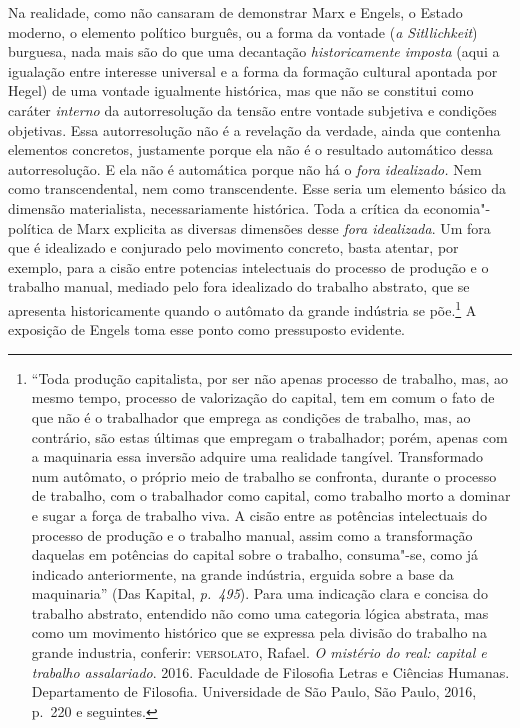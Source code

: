 Na realidade, como não cansaram de demonstrar Marx e Engels, o Estado
moderno, o elemento político burguês, ou a forma da vontade (\emph{a
Sitllichkeit}) burguesa, nada mais são do que uma decantação
\emph{historicamente imposta} (aqui a igualação entre interesse
universal e a forma da formação cultural apontada por Hegel) de uma
vontade igualmente histórica, mas que não se constitui como caráter
\emph{interno} da autorresolução da tensão entre vontade subjetiva e
condições objetivas. Essa autorresolução não é a revelação da verdade,
ainda que contenha elementos concretos, justamente porque ela não é o
resultado automático dessa autorresolução. E ela não é automática
porque não há o \emph{fora idealizado.} Nem como transcendental, nem
como transcendente. Esse seria um elemento básico da dimensão
materialista, necessariamente histórica. Toda a crítica da
economia"-política de Marx explicita as diversas dimensões desse
\emph{fora idealizada}. Um fora que é idealizado e conjurado pelo
movimento concreto, basta atentar, por exemplo, para a cisão entre %
potencias intelectuais do processo de produção e o trabalho manual,
mediado pelo fora idealizado do trabalho abstrato, que se apresenta
historicamente quando o autômato da grande indústria se põe.\footnote{``Toda
  produção capitalista, por ser não apenas processo de trabalho, mas, ao
  mesmo tempo, processo de valorização do capital, tem em comum o fato
  de que não é o trabalhador que emprega as condições de trabalho, mas,
  ao contrário, são estas últimas que empregam o trabalhador; porém,
  apenas com a maquinaria essa inversão adquire uma realidade tangível.
  Transformado num autômato, o próprio meio de trabalho se confronta,
  durante o processo de trabalho, com o trabalhador como capital, como
  trabalho morto a dominar e sugar a força de trabalho viva. A cisão
  entre as potências intelectuais do processo de produção e o trabalho
  manual, assim como a transformação daquelas em potências do capital
  sobre o trabalho, consuma"-se, como já indicado anteriormente, na
  grande indústria, erguida sobre a base da maquinaria'' (Das Kapital,
  \emph{p.~495}). Para uma indicação clara e concisa do trabalho
  abstrato, entendido não como uma categoria lógica abstrata, mas como
  um movimento histórico que se expressa pela divisão do trabalho na
  grande industria, conferir: \textsc{versolato}, Rafael. \emph{O
  mistério do real: capital e trabalho assalariado}. 2016. Faculdade de
  Filosofia Letras e Ciências Humanas. Departamento de Filosofia.
  Universidade de São Paulo, São Paulo, 2016, p.~220 e seguintes.} A
exposição de Engels toma esse ponto como pressuposto evidente.

